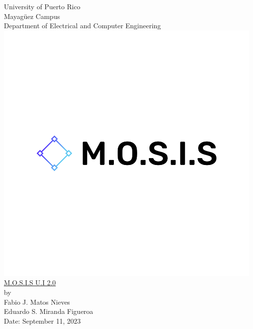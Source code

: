 \linespread{1.0}
\begin{titlepage}
  \begin{center}
    \large{University of Puerto Rico\\
    Mayagüez Campus\\
    \vspace{\baselineskip}
    Department of Electrical and Computer Engineering}
  \includegraphics[scale=0.2]{../M.O.S.I.S Logo/default.png}\\
    \Huge{\underline{M.O.S.I.S U.I 2.0}\\}
    \vspace{6cm}
    \large by\\
    Fabio J. Matos Nieves\\
    Eduardo S. Miranda Figueroa\\
    Date: September 11, 2023\\
    \normalsize

  \end{center}
\end{titlepage}
